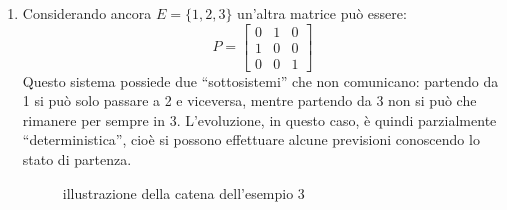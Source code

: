 \begin{ese}
\begin{enumerate}
		\item Considerando ancora $E=\{1,2,3\}$ un'altra matrice può essere:
		$$P = \begin{bmatrix} 0 & 1 & 0 \\ 1 & 0 & 0 \\ 0 & 0 & 1\end{bmatrix}$$
		Questo sistema possiede due ``sottosistemi'' che non comunicano: partendo da 1 si può solo passare a 2 e viceversa,
		mentre partendo da 3 non si può che rimanere per sempre in 3.
		L'evoluzione, in questo caso, è quindi parzialmente ``deterministica'', cioè si possono effettuare alcune previsioni conoscendo lo stato di partenza.

		\begin{figure}[H]
		  \centering
		  \caption{illustrazione della catena dell'esempio 3}
		\end{figure}

	\end{enumerate}
\end{ese}

